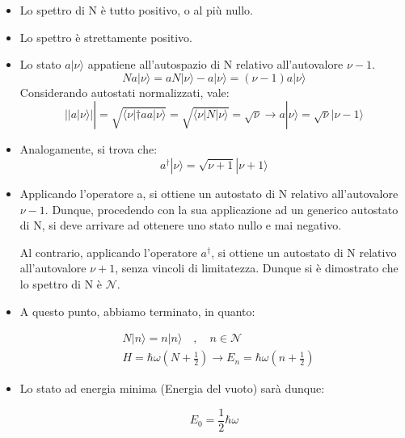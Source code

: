 \documentclass{article}
\begin{document}
\begin{itemize}
  \item Lo spettro di N è tutto positivo, o al più nullo.
  \item Lo spettro è strettamente positivo.
  \item Lo stato $a|\nu\rangle $ appatiene all'autospazio di N relativo all'autovalore $\nu-1$.
        \begin{equation}
          Na|\nu\rangle =aN|\nu\rangle -a|\nu\rangle =(\nu-1)a|\nu\rangle
        \end{equation}
        Considerando autostati normalizzati, vale:
        \begin{equation}
          ||a|\nu\rangle ||= \sqrt{\langle \nu|\dagger a a|\nu\rangle }=\sqrt{\langle \nu|N|\nu\rangle }=\sqrt{\nu} \rightarrow a|\nu\rangle =\sqrt{\nu}|\nu-1\rangle
        \end{equation}
  \item Analogamente, si trova che:
        \begin{equation}
          a^{\dagger}|\nu\rangle =\sqrt{\nu+1}|\nu+1\rangle
        \end{equation}
  \item Applicando l'operatore a, si ottiene un autostato di N relativo all'autovalore $\nu-1$. Dunque,
        procedendo con la sua applicazione ad un generico autostato di N, si deve arrivare ad ottenere uno stato nullo e mai negativo.

        Al contrario, applicando l'operatore $a^{\dagger}$, si ottiene un autostato di N relativo all'autovalore $\nu+1$, senza vincoli di limitatezza.
        Dunque si è dimostrato che lo spettro di N è $\mathcal{N}$.
  \item A questo punto, abbiamo terminato, in quanto:

        \begin{equation}
          \begin{aligned}
             & N |n\rangle =n|n\rangle  \quad , \quad n \in \mathcal{N}                  \\
             & H= \hbar\omega(N+\frac{1}{2}) \rightarrow E_n= \hbar\omega(n+\frac{1}{2})
          \end{aligned}
        \end{equation}
  \item Lo stato ad energia minima (Energia del vuoto) sarà dunque:

        \begin{equation}
          E_0=\frac{1}{2}\hbar \omega
        \end{equation}
\end{itemize}
\end{document}
